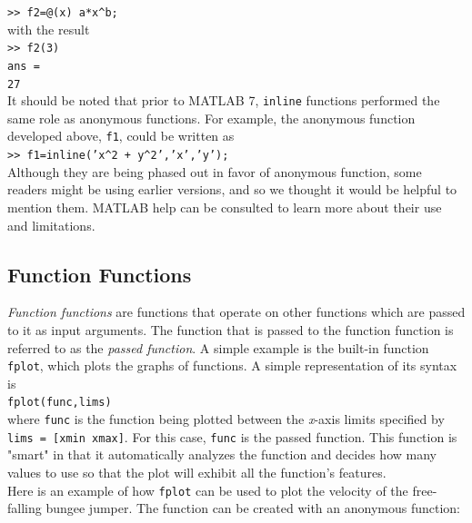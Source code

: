 \documentclass[../main.tex]{subfiles}
\begin{document}
\texttt{>> f2=@(x) a*x\textasciicircum b;}\\

\noindent with the result\\

\texttt{>> f2(3)\\
\indent ans =\\ 
\indent\hspace{2mm} 27}\\

It should be noted that prior to MATLAB 7, \texttt{inline} functions performed the same
role as anonymous functions. For example, the anonymous function developed above, \texttt{f1},
could be written as\\

\texttt{>> f1=inline('x\textasciicircum 2 + y\textasciicircum 2','x','y');}\\

\noindent
Although they are being phased out in favor of anonymous function, some readers might be
using earlier versions, and so we thought it would be helpful to mention them. MATLAB
help can be consulted to learn more about their use and limitations.

\subsection{Function Functions}
\noindent
\emph{Function functions} are functions that operate on other functions which are passed to it as
input arguments. The function that is passed to the function function is referred to as the
\emph{passed function}. A simple example is the built-in function \texttt{fplot}, which plots the graphs
of functions. A simple representation of its syntax is\\

\texttt{fplot(func,lims)}\\

where \texttt{func} is the function being plotted between the \emph{x}-axis limits specified by \texttt{lims = [xmin xmax]}. 
For this case, \texttt{func} is the passed function. This function is "smart" in that it
automatically analyzes the function and decides how many values to use so that the plot
will exhibit all the function's features.\\
\indent Here is an example of how \texttt{fplot} can be used to plot the velocity of the free-falling
bungee jumper. The function can be created with an anonymous function:\\
\end{document}
